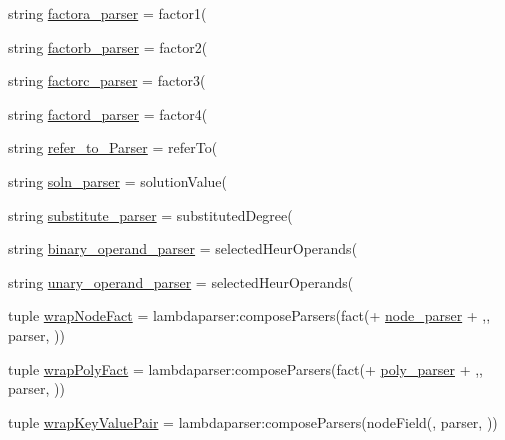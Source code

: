 \begin{DoxyCompactItemize}
\item 
string \hyperlink{namespaceeqn__viz_a854e9036019062010a0620dca4adcf5f}{factora\+\_\+parser} = \textquotesingle{}factor1(\textquotesingle{}
\item 
string \hyperlink{namespaceeqn__viz_a830b341130da6861c90efd9ac0858486}{factorb\+\_\+parser} = \textquotesingle{}factor2(\textquotesingle{}
\item 
string \hyperlink{namespaceeqn__viz_addfe6dbd1f7e4817decc2f392291d743}{factorc\+\_\+parser} = \textquotesingle{}factor3(\textquotesingle{}
\item 
string \hyperlink{namespaceeqn__viz_a17e1b80ac39bb02b3448c7cc9e5e7821}{factord\+\_\+parser} = \textquotesingle{}factor4(\textquotesingle{}
\item 
string \hyperlink{namespaceeqn__viz_a28dbd804760bc7a217c14254976e5575}{refer\+\_\+to\+\_\+\+Parser} = \textquotesingle{}refer\+To(\textquotesingle{}
\item 
string \hyperlink{namespaceeqn__viz_ab4bb266f8ba35459c0d095bcffadbad4}{soln\+\_\+parser} = \textquotesingle{}solution\+Value(\textquotesingle{}
\item 
string \hyperlink{namespaceeqn__viz_aacd332e3c02218eb9ae4ec66a3e31fd0}{substitute\+\_\+parser} = \textquotesingle{}substituted\+Degree(\textquotesingle{}
\item 
string \hyperlink{namespaceeqn__viz_a7a7eda2f6b22edf43034366ee5b0e433}{binary\+\_\+operand\+\_\+parser} = \textquotesingle{}selected\+Heur\+Operands(\textquotesingle{}
\item 
string \hyperlink{namespaceeqn__viz_a0eb89bf8984a1b19989d2031cae402a6}{unary\+\_\+operand\+\_\+parser} = \textquotesingle{}selected\+Heur\+Operands(\textquotesingle{}
\item 
tuple \hyperlink{namespaceeqn__viz_a716255e5870a531e1bfc6d184278bc8d}{wrap\+Node\+Fact} = lambdaparser\+:compose\+Parsers(\textquotesingle{}fact(\textquotesingle{}+ \hyperlink{namespaceeqn__viz_aa3f9b7373809e0e391e1383fd878b616}{node\+\_\+parser} + \textquotesingle{},\textquotesingle{}, parser, \textquotesingle{})\textquotesingle{})
\item 
tuple \hyperlink{namespaceeqn__viz_aa72fea76ddf1127d6dbcb77d7c76c63d}{wrap\+Poly\+Fact} = lambdaparser\+:compose\+Parsers(\textquotesingle{}fact(\textquotesingle{}+ \hyperlink{namespaceeqn__viz_aa45f3f597ca3ecacab90d141137afe1c}{poly\+\_\+parser} + \textquotesingle{},\textquotesingle{}, parser, \textquotesingle{})\textquotesingle{})
\item 
tuple \hyperlink{namespaceeqn__viz_adf51f57cbfcd953ec98550b85dcc3d0c}{wrap\+Key\+Value\+Pair} = lambdaparser\+:compose\+Parsers(\textquotesingle{}node\+Field(\textquotesingle{}, parser, \textquotesingle{})\textquotesingle{})

\end{DoxyCompactItemize}
